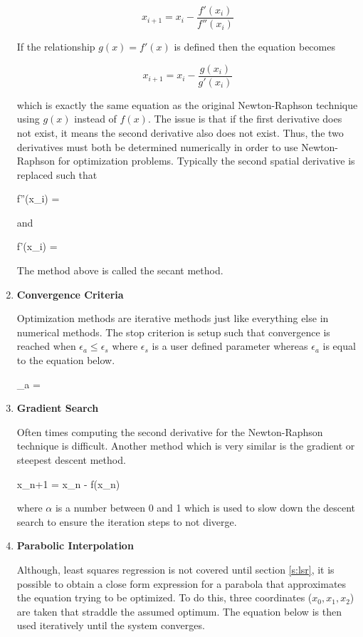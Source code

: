 \begin{enumerate}
\begin{equation}
x_{i+1} = x_i - \frac{f'(x_i)}{f''(x_i)}
\end{equation}

If the relationship $g(x)=f'(x)$ is defined then the equation becomes

\begin{equation}
x_{i+1} = x_i - \frac{g(x_i)}{g'(x_i)}
\end{equation}

which is exactly the same equation as the original Newton-Raphson
technique using $g(x)$ instead of $f(x)$. The issue is that if the
first derivative does not exist, it means the second derivative also
does not exist. Thus, the two derivatives must both be determined
numerically in order to use Newton-Raphson for optimization
problems. Typically the second spatial derivative is replaced such
that

\beq
f''(x_i) =  
\eeq

and 

\beq
f'(x_i) = 
\eeq

The method above is called the secant method.

\item{\bf Convergence Criteria}

Optimization methods are iterative methods just like everything else
in numerical methods. The stop criterion is setup such that
convergence is reached when $\epsilon_a \le \epsilon_s$ where $\epsilon_s$ is a
user defined parameter whereas $\epsilon_a$ is equal to the equation
below.

\beq
\epsilon_a = 
\eeq

\item {\bf Gradient Search}

Often times computing the second derivative for the Newton-Raphson
technique is difficult. Another method which is very similar is the
gradient or steepest descent method. 

\beq
x_{n+1} = x_{n} - \alpha \nabla f(x_n)
\eeq

where $\alpha$ is a number between 0 and 1 which is used to slow down
the descent search to ensure the iteration steps to not diverge. 

\item {\bf Parabolic Interpolation}

Although, least squares regression is not covered until section
\ref{s:lsr}, it is possible to obtain a close form expression for a
parabola that approximates the equation trying to be optimized. To do
this, three coordinates ($x_0,x_1,x_2$) are taken that straddle the assumed
optimum. The equation below is then used iteratively until the system
converges. 


\end{enumerate}
